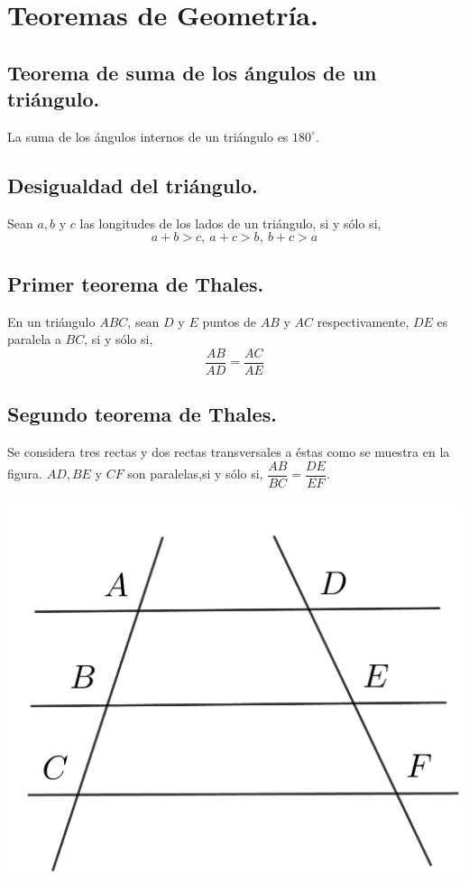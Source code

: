 \documentclass[12pt,a4paper,oneside]{book}
\begin{document}
\setlength{\parindent}{0 pt}
\author{Axel Aveiga}
\renewcommand{\headrulewidth}{0.5pt}
\cfoot{}

\tableofcontents
\let\cleardoublepage\clearpage

\chapter{Teoremas de Geometría.}
\section{Teorema de suma de los ángulos de un triángulo.} 
La suma de los ángulos internos de un triángulo es $180^\circ$.
\section{Desigualdad del triángulo.}
Sean $a, b$ y $c$ las longitudes de los lados de un triángulo, si y sólo si, 
$$a+b>c,\> a+c>b, \> b+c>a$$
\section{Primer teorema de Thales.}
En un triángulo $ABC$, sean $D$ y $E$ puntos de $AB$
y $AC$ respectivamente, $DE$ es paralela a $BC$, si y sólo si, $$\dfrac{AB}{AD}=\dfrac{AC}{AE}$$
\section{Segundo teorema de Thales.}
Se considera tres rectas y dos rectas transversales a éstas como se muestra en la figura. $AD, BE$ y $CF$ son paralelas,si y sólo si, $\dfrac{AB}{BC}=\dfrac{DE}{EF}$.
\begin{center}
\includegraphics[scale=0.45]{Imagenes/thales.png}
\end{center}
\newpage
\end{document}
